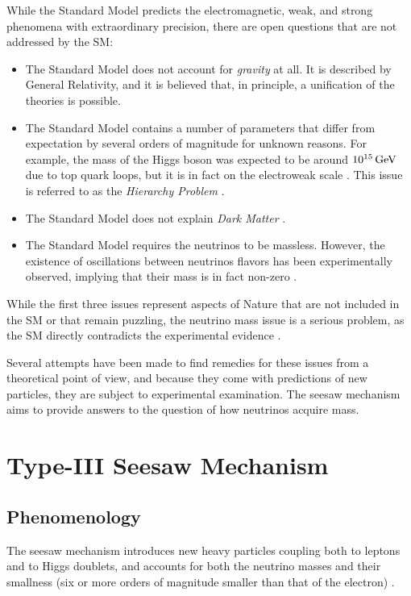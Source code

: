 While the Standard Model predicts the electromagnetic, weak, and strong phenomena with extraordinary precision, there are open questions that are not addressed by the SM:
\begin{itemize}
	\item The Standard Model does not account for \textit{gravity} at all. It is described by General Relativity, and it is believed that, in principle, a unification of the theories is possible.
	\item The Standard Model contains a number of parameters that differ from expectation by several orders of magnitude for unknown reasons. For example, the mass of the Higgs boson was expected to be around $10^{15}\,\text{Ge\hspace{-.08em}V}$ due to top quark loops, but it is in fact on the electroweak scale \cite{Aad:2015zhl}. This issue is referred to as the \textit{Hierarchy Problem} \cite{Martin:1997ns}.
	\item The Standard Model does not explain \textit{Dark Matter} \cite{}.
	\item The Standard Model requires the neutrinos to be massless. However, the existence of oscillations between neutrinos flavors has been experimentally observed, implying that their mass is in fact non-zero \cite{PhysRevD.22.2227,Fukuda:1998fd,Nustatus}.
\end{itemize}

While the first three issues represent aspects of Nature that are not included in the SM or that remain puzzling, the neutrino mass issue is a serious problem, as the SM directly contradicts the experimental evidence \cite{Fukuda:1998fd}.

Several attempts have been made to find remedies for these issues from a theoretical point of view, and because they come with predictions of new particles, they are subject to experimental examination. The seesaw mechanism aims to provide answers to the question of how neutrinos acquire mass. 

\section{Type-III Seesaw Mechanism}
\subsection{Phenomenology}
The seesaw mechanism introduces new heavy particles coupling both to leptons and to Higgs doublets, and accounts for both the neutrino masses and their smallness (six or more orders of magnitude smaller than that of the electron) \cite{SeesawI,typeIa,typeIb,typeIe,typeIIa,typeIIb,typeIIc,typeIId,typeIIe,SeesawIII:a,Seesawinverse}.

